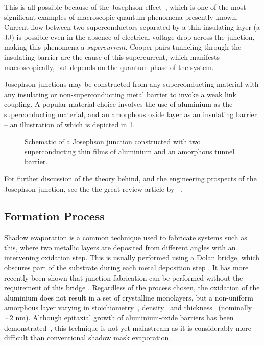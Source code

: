 This is all possible because of the Josephson effect~\cite{Josephson1962,Josephson1965}, which is one of the most significant examples of macroscopic quantum phenomena presently known.
Current flow between two superconductors separated by a thin insulating layer (\ie a JJ) is possible even in the absence of electrical voltage drop across the junction, making this phenomena a \textit{supercurrent}.
Cooper pairs tunneling through the insulating barrier are the cause of this supercurrent, which manifests macroscopically, but depends on the quantum phase of the system.

Josephson junctions may be constructed from any superconducting material with any insulating or non-superconducting metal barrier to invoke a weak link coupling.
A popular material choice involves the use of aluminium as the superconducting material, and an amorphous oxide layer as an insulating barrier -- an illustration of which is depicted in \cref{fig:jjdiagram}.

\begin{figure}[htp]
\resizebox{0.75\textwidth}{!}{}
\caption[Josephson Junction Schematic]{\label{fig:jjdiagram}Schematic of a Josephson junction constructed with two superconducting thin films of aluminium and an amorphous  tunnel barrier.}
\end{figure}

For further discussion of the theory behind, and the engineering prospects of the Josephson junction, see the the great review article by \citeauthor{Makhlin2001}~\cite{Makhlin2001}.

\subsection{Formation Process}\label{sec:formation}

Shadow evaporation is a common technique used to fabricate systems such as this, where two metallic layers are deposited from different angles with an intervening oxidation step.
This is usually performed using a Dolan bridge, which obscures part of the substrate during each metal deposition step \cite{Dolan1977}.
It has more recently been shown that junction fabrication can be performed without the requirement of this bridge \cite{Lecocq2011}.
Regardless of the process chosen, the oxidation of the aluminium does not result in a set of crystalline monolayers, but a non-uniform amorphous layer varying in stoichiometry~\cite{Park2002, Tan2005}, density~\cite{Barbour1998} and thickness~\cite{Gloos2003,Aref2014,Zeng2014} (nominally $\sim\!2$ nm).  Although epitaxial growth of aluminium-oxide barriers has been demonstrated~\cite{Oh2006}, this technique is not yet mainstream as it is considerably more difficult than conventional shadow mask evaporation.


